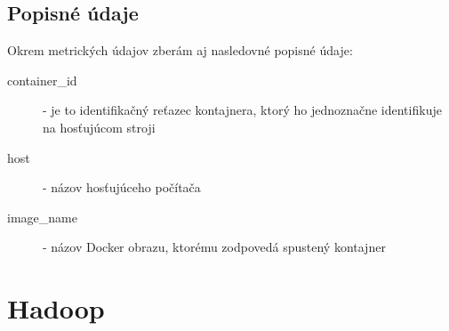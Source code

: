 \documentclass[12pt,twoside,color,cover,table]{fithesis3}
\begin{document}
\subsection{Popisné údaje}
Okrem metrických údajov zberám aj nasledovné popisné údaje:
\begin{description}
\item[container\_id] - je to identifikačný reťazec kontajnera, ktorý ho jednoznačne identifikuje na hosťujúcom stroji
\item[host] - názov hosťujúceho počítača
\item[image\_name] - názov Docker obrazu, ktorému zodpovedá spustený kontajner
\end{description}

\section{Hadoop}
\end{document}
